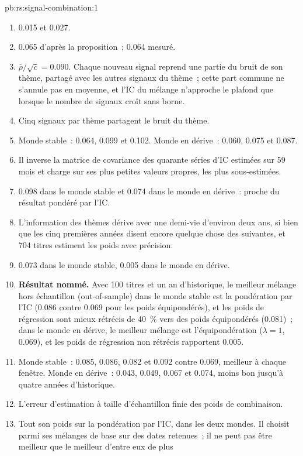 \begin{solution}{pb:rs:signal-combination:1}
\begin{enumerate}
\item 0.015 et 0.027.
\item 0.065 d'après la proposition~; 0.064 mesuré.
\item $\bar\rho/\sqrt{\bar c} = 0.090$. Chaque nouveau signal reprend une partie du bruit de son thème, partagé avec les autres signaux du thème~; cette part commune ne
s'annule pas en moyenne, et l'IC du mélange n'approche le plafond que lorsque le nombre de signaux croît sans borne.
\item Cinq signaux par thème partagent le bruit du thème.
\item Monde stable~: 0.064, 0.099 et 0.102. Monde en dérive~: 0.060, 0.075 et 0.087.
\item Il inverse la matrice de covariance des quarante séries d'IC estimées sur 59 mois et charge sur ses plus petites valeurs propres, les plus sous-estimées.
\item 0.098 dans le monde stable et 0.074 dans le monde en dérive~: proche du résultat pondéré par l'IC.
\item L'information des thèmes dérive avec une demi-vie d'environ deux ans, si bien que les cinq premières années disent encore quelque chose des suivantes, et 704 titres
estiment les poids avec précision.
\item 0.073 dans le monde stable, 0.005 dans le monde en dérive.
\item \textbf{Résultat nommé.} Avec 100 titres et un an d'historique, le meilleur mélange hors échantillon (out-of-sample) dans le monde stable est la pondération par l'IC (0.086 contre 0.069
pour les poids équipondérés), et les poids de régression sont mieux rétrécis de 40~\% vers des poids équipondérés (0.081)~; dans le monde en dérive, le meilleur mélange est l'équipondération
($\lambda = 1$, 0.069), et les poids de régression non rétrécis rapportent 0.005.
\item Monde stable~: 0.085, 0.086, 0.082 et 0.092 contre 0.069, meilleur à chaque fenêtre. Monde en dérive~: 0.043, 0.049, 0.067 et 0.074, moins bon jusqu'à quatre
années d'historique.
\item L'erreur d'estimation à taille d'échantillon finie des poids de combinaison.
\item Tout son poids sur la pondération par l'IC, dans les deux mondes. Il choisit parmi ses mélanges de base sur des dates retenues~; il ne peut pas être meilleur que le meilleur d'entre eux de plus

\end{enumerate}
\end{solution}
